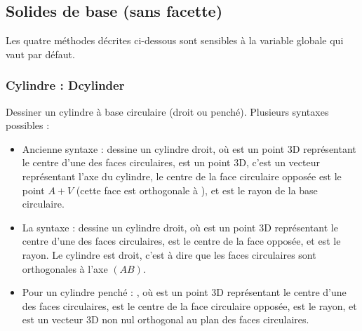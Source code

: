 \subsection{Solides de base (sans facette)}

Les quatre méthodes décrites ci-dessous sont sensibles à la variable globale  qui vaut \false par défaut.

\subsubsection{Cylindre : Dcylinder}

Dessiner un cylindre à base circulaire (droit ou penché). Plusieurs syntaxes possibles :
\begin{itemize}
    \item Ancienne syntaxe :  dessine un cylindre droit, où  est un point 3D représentant le centre d'une des faces circulaires,  est un point 3D, c'est un vecteur représentant l'axe du cylindre, le centre de la face circulaire opposée est le point $A+V$ (cette face est orthogonale à ), et  est le rayon de la base circulaire.
    
    \item La syntaxe :  dessine un cylindre droit, où  est un point 3D représentant le centre d'une des faces circulaires,  est le centre de la face opposée, et  est le rayon. Le cylindre est droit, c'est à dire que les faces circulaires sont orthogonales à l'axe $(AB)$.
    
    \item Pour un cylindre penché :  , où  est un point 3D représentant le centre d'une des faces circulaires,  est le centre de la face circulaire opposée,  est le rayon, et  est un vecteur 3D non nul orthogonal au plan des faces circulaires.
\end{itemize}

